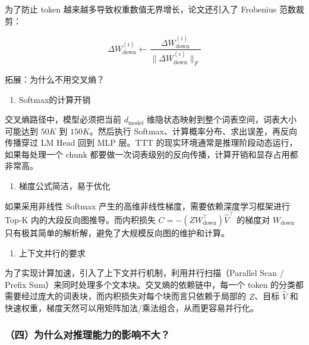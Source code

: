 为了防止 token 越来越多导致权重数值无界增长，论文还引入了 Frobenius 范数裁剪：

\[
\Delta W_{\mathrm{down}}^{(i)}
\leftarrow
\frac{\Delta W_{\mathrm{down}}^{(i)}}{\|\Delta W_{\mathrm{down}}^{(i)}\|_F}
\]

拓展：为什么不用交叉熵？

\begin{enumerate}
\def\labelenumi{\arabic{enumi}.}
\tightlist
\item
  Softmax的计算开销
\end{enumerate}

交叉熵路径中，模型必须把当前 \(d_{\mathrm{model}}\) 维隐状态映射到整个词表空间，词表大小可能达到 \(50K\) 到 \(150K\)。然后执行 Softmax、计算概率分布、求出误差，再反向传播穿过 LM Head 回到 MLP 层。TTT 的现实环境通常是推理阶段动态运行，如果每处理一个 chunk 都要做一次词表级别的反向传播，计算开销和显存占用都非常高。

\begin{enumerate}
\def\labelenumi{\arabic{enumi}.}
\setcounter{enumi}{1}
\tightlist
\item
  梯度公式简洁，易于优化
\end{enumerate}

如果采用非线性 Softmax 产生的高维非线性梯度，需要依赖深度学习框架进行 Top-K 内的大段反向图推导。而内积损失 \(C=-(ZW_{\mathrm{down}}^\top)\hat V^\top\) 的梯度对 \(W_{\mathrm{down}}\) 只有极其简单的解析解，避免了大规模反向图的维护和计算。

\begin{enumerate}
\def\labelenumi{\arabic{enumi}.}
\setcounter{enumi}{2}
\tightlist
\item
  上下文并行的要求
\end{enumerate}

为了实现计算加速，引入了上下文并行机制，利用并行扫描（Parallel Scan / Prefix Sum）来同时处理多个文本块。交叉熵的依赖链中，每一个 token 的分类都需要经过庞大的词表块，而内积损失对每个块而言只依赖于局部的 \(Z\)、目标 \(\hat V\) 和快速权重，梯度天然可以用矩阵加法/乘法组合，从而更容易并行化。

\hypertarget{ux56dbux4e3aux4ec0ux4e48ux5bf9ux63a8ux7406ux80fdux529bux7684ux5f71ux54cdux4e0dux5927}{%
\subsubsection{（四）为什么对推理能力的影响不大？}\label{ux56dbux4e3aux4ec0ux4e48ux5bf9ux63a8ux7406ux80fdux529bux7684ux5f71ux54cdux4e0dux5927}}

